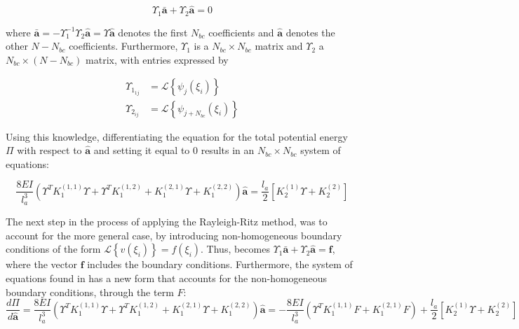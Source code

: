 \begin{equation}
\label{eq:new_form_of_BC}
    \Upsilon_{1} \mathbf{\bar{a}}+\Upsilon_{2} \mathbf{\hat{a}}=0
\end{equation}

\noindent where $\mathbf{\bar{a}}=-\Upsilon_{1}^{-1} {\Upsilon}_{2} \hat{\mathbf{a}}=\Upsilon \hat{\mathbf{a}}$ denotes the first $N_{bc}$ coefficients and $\mathbf{\hat{a}}$ denotes the other $N-N_{bc}$ coefficients. Furthermore, $\Upsilon_{1}$ is a $N_{b c} \times N_{b c}$ matrix and $\Upsilon_{2}$ a $N_{b c} \times\left(N-N_{b c}\right)$ matrix, with entries expressed by

$$
\begin{aligned}
\Upsilon_{1_{1 j}} &=\mathcal{L}\left\{\psi_{j}\left(\xi_{i}\right)\right\} \\
\Upsilon_{2_{i j}} &=\mathcal{L}\left\{\psi_{j+N_{b c}}\left(\xi_{i}\right)\right\}
\end{aligned}
$$

\noindent Using this knowledge, differentiating the equation for the total potential energy $\Pi$ with respect to $\mathbf{\hat{a}}$ and setting it equal to 0 results in an $N_{b c} \times N_{b c}$ system of equations:

\begin{equation}
\label{eq:first_system}
    \frac{8 E I}{l_{a}^{3}}\left(\Upsilon^{T} K_{1}^{(1,1)} \Upsilon+\Upsilon^{T} K_{1}^{(1,2)}+K_{1}^{(2,1)} \Upsilon+K_{1}^{(2,2)}\right) \hat{\mathbf{a}}=\frac{l_{a}}{2}\left[K_{2}^{(1)} \Upsilon+K_{2}^{(2)}\right]
\end{equation}

\noindent The next step in the process of applying the Rayleigh-Ritz method, was to account for the more general case, by introducing non-homogeneous boundary conditions of the form $\mathcal{L}\left\{v\left(\xi_{i}\right)\right\}=f\left(\xi_{i}\right)$. Thus,  becomes $\Upsilon_{1} \mathbf{\bar{a}}+\Upsilon_{2} \mathbf{\hat{a}}=\mathbf{f}$, where the vector $\mathbf{f}$ includes the boundary conditions. Furthermore, the system of equations found in  has a new form that accounts for the non-homogeneous boundary conditions, through the term $F$:
\begin{equation}
    \label{eq:second_system}
    \frac{d \Pi}{d \hat{\mathbf{a}}}=\frac{8 E I}{l_{a}^{3}}\left(\Upsilon^{T} K_{1}^{(1,1)} {\Upsilon}+\Upsilon^{T} K_{1}^{(1,2)}+K_{1}^{(2,1)} {\Upsilon}+K_{1}^{(2,2)}\right) \hat{\mathbf{a}}=-\frac{8 E I}{l_{a}^{3}}\left({\Upsilon}^{T} K_{1}^{(1,1)} F+K_{1}^{(2,1)} F\right)+\frac{l_{a}}{2}\left[K_{2}^{(1)} {\Upsilon}+K_{2}^{(2)}\right]
\end{equation}


